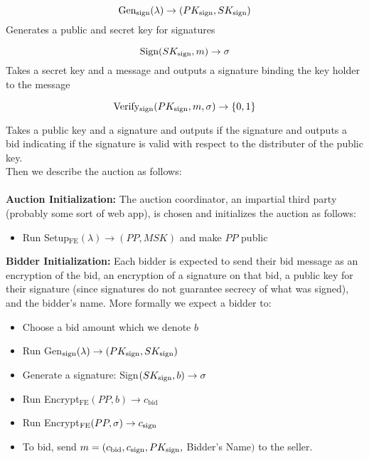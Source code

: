 \documentclass[12pt,twoside]{reedthesis}
\begin{document}
    
    
    $$\text{Gen$_\text{sign}(\lambda) \to (PK_\text{sign},SK_\text{sign})$}$$ 
Generates a public and secret key for signatures
    
    
    
    $$\text{Sign$(SK_\text{sign},m) \to \sigma$}$$ 
    Takes a secret key and a message and outputs a signature binding the key holder to the message
    
    $$\text{Verify$_\text{sign}(PK_\text{sign},m,\sigma)\to \{0,1\}$}$$
    
    Takes a public key and a signature and outputs if the signature and outputs a bid indicating if the signature is valid with respect to the distributer of the public key. \\
    Then we describe the auction as follows: \\ \\
        \textbf{Auction Initialization:} The auction coordinator, an impartial third party (probably some sort of web app), is chosen and initializes the auction as follows:
    \begin{itemize}
    \item Run Setup$_\text{FE}(\lambda)\to (PP,MSK)$ and make $PP$ public
    \end{itemize}
%
%
%
    \textbf{Bidder Initialization:} Each bidder is expected to send their bid message as an encryption of the bid, an encryption of a signature on that bid, a public key for their signature (since signatures do not guarantee secrecy of what was signed), and the bidder's name. More formally we expect a bidder to:
     \begin{itemize}
     \item Choose a bid amount which we denote $b$
     \item Run Gen$_\text{sign}(\lambda) \to (PK_\text{sign},SK_\text{sign})$
     \item Generate a signature: Sign$(SK_\text{sign},b)\to \sigma$
     \item Run Encrypt$_\text{FE}(PP,b) \to c_\text{bid}$
     \item Run  Encrypt$_\text{FE}(PP,\sigma)\to c_\text{sign}$
     \item To bid, send $m = (c_\text{bid},c_\text{sign},PK_\text{sign},$ Bidder's Name$)$ to the seller.
     \end{itemize} 
     
\end{document}
